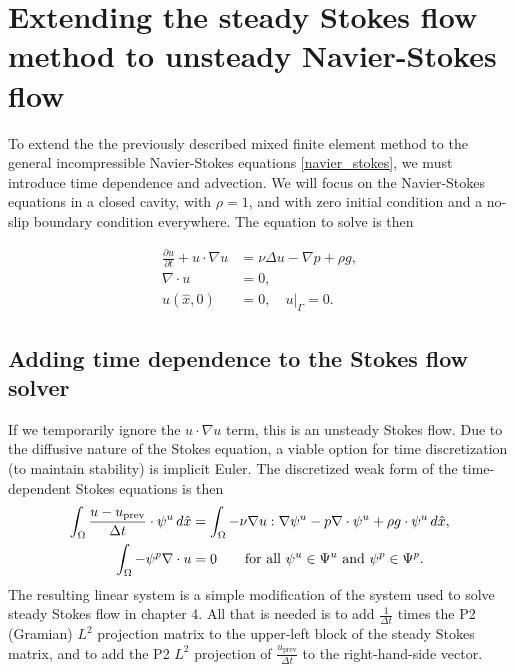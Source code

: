 \section{Extending the steady Stokes flow method to unsteady Navier-Stokes flow}

To extend the the previously described mixed finite element method to the general incompressible Navier-Stokes equations \eqref{navier_stokes},
we must introduce time dependence and advection. We will focus on the Navier-Stokes equations in a closed cavity, with $\rho = 1$, and with zero initial condition and
a no-slip boundary condition everywhere. The equation to solve is then

\begin{equation}\label{navier_stokes_ibvp}
\begin{split}
    \frac{\partial u}{\partial t} + u\cdot\nabla u &= \nu\Delta u - \nabla p + \rho g,\\
    \nabla\cdot u &= 0,\\
    u(\hat{x}, 0) &= 0, \quad \left.u\right|_\Gamma = 0.
\end{split}
\end{equation}

\subsection{Adding time dependence to the Stokes flow solver}
If we temporarily ignore the $u\cdot \nabla u$ term,
this is an unsteady Stokes flow.
Due to the diffusive nature of the Stokes equation, a viable option for time discretization (to maintain stability) is implicit Euler.
The discretized weak form of the time-dependent Stokes equations is then
\newcommand{\uprev}{{u_{\text{prev}}}}
\begin{equation}
\begin{split}
    \int_\om \frac{u - \uprev}{\Delta t}\cdot \psi^u\,d\hat{x}
        &= \int_\om -\nu \nabla u : \nabla \psi^u - p\nabla\cdot \psi^u + \rho g \cdot \psi^u\,d\hat{x},\\
    \int_\om -\psi^p \nabla\cdot u &= 0 \text{\quad\quad for all $\psi^u \in \Psi^u$ and $\psi^p \in \Psi^p$.}
\end{split}
\end{equation}
The resulting linear system is a simple modification of the system used to solve steady Stokes flow in chapter 4.
All that is needed is to add $\frac{1}{\Delta t}$ times the P2 (Gramian) $L^2$ projection matrix to the upper-left block of the steady Stokes matrix,
and to add the P2 $L^2$ projection of $\frac{\uprev}{\Delta t}$ to the right-hand-side vector.

